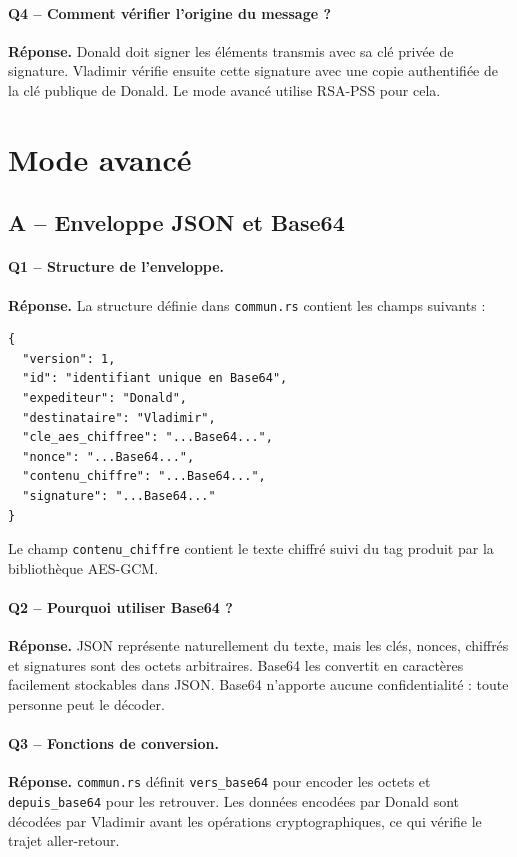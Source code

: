 \documentclass[11pt,a4paper]{article}
\newcommand{\fichier}[1]{\texttt{#1}}
\newcommand{\reponse}{\textbf{Réponse.} }
\begin{document}
\paragraph{Q4 -- Comment vérifier l'origine du message ?}
\reponse Donald doit signer les éléments transmis avec sa clé privée de signature.
Vladimir vérifie ensuite cette signature avec une copie authentifiée de la clé publique
de Donald. Le mode avancé utilise RSA-PSS pour cela.

\section{Mode avancé}

\subsection{A -- Enveloppe JSON et Base64}

\paragraph{Q1 -- Structure de l'enveloppe.}
\reponse La structure définie dans \fichier{commun.rs} contient les champs suivants :

\begin{lstlisting}[language={},caption={Structure logique de l'enveloppe JSON}]
{
  "version": 1,
  "id": "identifiant unique en Base64",
  "expediteur": "Donald",
  "destinataire": "Vladimir",
  "cle_aes_chiffree": "...Base64...",
  "nonce": "...Base64...",
  "contenu_chiffre": "...Base64...",
  "signature": "...Base64..."
}
\end{lstlisting}

Le champ \texttt{contenu\_chiffre} contient le texte chiffré suivi du tag produit par
la bibliothèque AES-GCM.

\paragraph{Q2 -- Pourquoi utiliser Base64 ?}
\reponse JSON représente naturellement du texte, mais les clés, nonces, chiffrés et
signatures sont des octets arbitraires. Base64 les convertit en caractères facilement
stockables dans JSON. Base64 n'apporte aucune confidentialité : toute personne peut le
décoder.

\paragraph{Q3 -- Fonctions de conversion.}
\reponse \fichier{commun.rs} définit \texttt{vers\_base64} pour encoder les octets et
\texttt{depuis\_base64} pour les retrouver. Les données encodées par Donald sont
décodées par Vladimir avant les opérations cryptographiques, ce qui vérifie le trajet
aller-retour.
\end{document}
